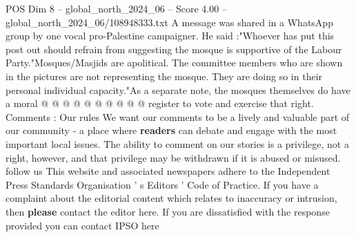 \begin{textsample}{POS Dim 8 – global\_north\_2024\_06 – Score 4.00 – global\_north\_2024\_06/108948333.txt}
A message was shared in a WhatsApp group by one vocal pro-Palestine campaigner.
He said :"Whoever has put this post out should refrain from suggesting the mosque is supportive of the Labour Party."Mosques/Masjids are apolitical.
The committee members who are shown in the pictures are not representing the mosque.
They are doing so in their personal individual capacity."As a separate note, the mosques themselves do have a moral @ @ @ @ @ @ @ @ @ @ register to vote and exercise that right.
Comments : Our rules We want our comments to be a lively and valuable part of our community - a place where \textbf{readers} can debate and engage with the most important local issues.
The ability to comment on our stories is a privilege, not a right, however, and that privilege may be withdrawn if it is abused or misused. follow us This website and associated newspapers adhere to the Independent Press Standards Organisation ' s Editors ' Code of Practice.
If you have a complaint about the editorial content which relates to inaccuracy or intrusion, then \textbf{please} contact the editor here.
If you are dissatisfied with the response provided you can contact IPSO here

\end{textsample}
